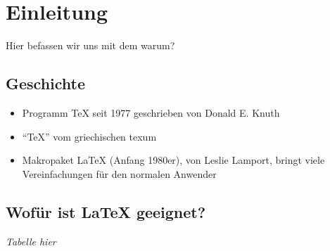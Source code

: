 \section{Einleitung}
Hier befassen wir uns mit dem warum?

\subsection{Geschichte}
\begin{itemize}
    \item Programm TeX seit 1977 geschrieben von Donald E. Knuth
    \item "`TeX"' vom griechischen texum
    \item Makropaket LaTeX (Anfang 1980er), von Leslie Lamport, bringt viele Vereinfachungen für den normalen Anwender
\end{itemize}


\subsection{Wofür ist LaTeX geeignet?}
\textit{Tabelle hier}
\blindtext
\newpage